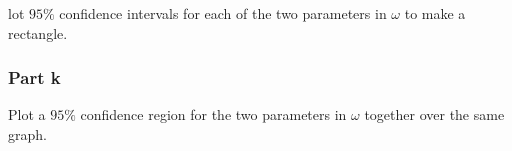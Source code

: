 \begin{question}
    lot $95\%$ confidence intervals for each of the two parameters in $\omega$ to make a rectangle.
\end{question}

\begin{answer}
    
\end{answer}

\subsubsection{Part k}

\begin{question}
    Plot a $95\%$ confidence region for the two parameters in $\omega$ together over the same graph.
\end{question}

\begin{answer}
    
\end{answer}